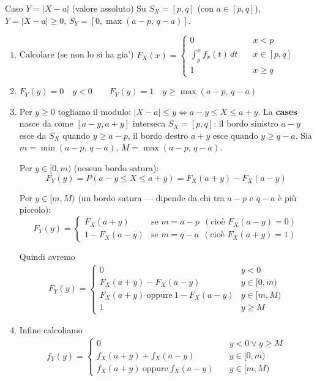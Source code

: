 \documentclass[11pt]{article}
\begin{document}
\begin{concetto}[barGreen]{Caso $Y=|X-a|$ (valore assoluto)}
Su $S_X=[p,q]$ (con $a\in[p,q]$), $Y=|X-a|\ge0$, $S_Y=[0,\max(a-p,\,q-a)]$.
\begin{enumerate}
\item Calcolare (se non lo si ha gia') $F_X(x) =  \begin{cases}
0 \quad & x < p \\
\int_{p}^x f_x(t) \, dt \quad & x \in [p,q]\\
1 \quad & x \geq q
  \end{cases}$

\item $F_Y(y)=0 \quad y < 0 \qquad F_Y(y)=1 \quad y \geq \max(a-p,\,q-a)$

\item Per $y\ge0$ togliamo il modulo: $|X-a|\le y \iff a-y\le X\le a+y$. La \textbf{cases} nasce da come $[a-y,a+y]$ interseca $S_X=[p,q]$: il bordo sinistro $a-y$ esce da $S_X$ quando $y\ge a-p$, il bordo destro $a+y$ esce quando $y\ge q-a$. Sia $m=\min(a-p,\,q-a)$, $M=\max(a-p,\,q-a)$.

Per $y\in[0,m)$ (nessun bordo satura):
\[ F_Y(y)=P(a-y\le X\le a+y)=F_X(a+y)-F_X(a-y) \]

Per $y\in[m,M)$ (un bordo satura — dipende da chi tra $a-p$ e $q-a$ è più piccolo):
\[
F_Y(y)=
\begin{cases}
F_X(a+y) & \text{se } m=a-p \ \ (\text{cio\`e } F_X(a-y)=0)\\
1-F_X(a-y) & \text{se } m=q-a \ \ (\text{cio\`e } F_X(a+y)=1)
\end{cases}
\]

Quindi avremo
\begin{align*}
  F_Y(y)= \begin{cases}
    0 & y < 0\\
    F_X(a+y)-F_X(a-y) & y\in[0,m)\\
    F_X(a+y) \ \text{oppure} \ 1-F_X(a-y) & y \in [m, M)\\
    1 & y \geq M
\end{cases}
\end{align*}

\item Infine calcoliamo
\begin{align*}
  f_Y(y) = \begin{cases}
0 \quad & y < 0 \lor y \geq M\\
    f_X(a+y)+f_X(a-y) \quad & y \in [0, m)\\
    f_X(a+y) \ \text{oppure} \ f_X(a-y) \quad & y \in [m,M)
\end{cases}
\end{align*}


\end{enumerate}
\end{concetto}
\end{document}
